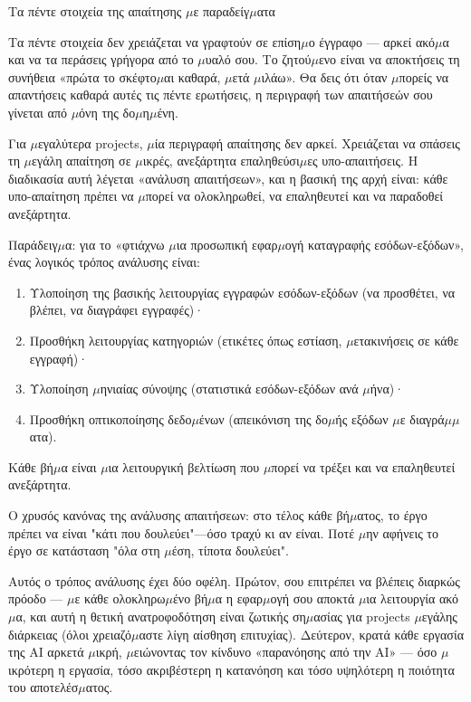 \begin{center}\small\color{gray}Τα πέντε στοιχεία της απαίτησης $\mu$ε παραδείγ$\mu$ατα\end{center}

Τα πέντε στοιχεία δεν χρειάζεται να γραφτούν σε επίση$\mu$ο έγγραφο — αρκεί ακό$\mu$α και να τα περάσεις γρήγορα από το $\mu$υαλό σου. Το ζητού$\mu$ενο είναι να αποκτήσεις τη συνήθεια «πρώτα το σκέφτο$\mu$αι καθαρά, $\mu$ετά $\mu$ιλάω». Θα δεις ότι όταν $\mu$πορείς να απαντήσεις καθαρά αυτές τις πέντε ερωτήσεις, η περιγραφή των απαιτήσεών σου γίνεται από $\mu$όνη της δο$\mu$η$\mu$ένη.


Για $\mu$εγαλύτερα projects, $\mu$ία περιγραφή απαίτησης δεν αρκεί. Χρειάζεται να σπάσεις τη $\mu$εγάλη απαίτηση σε $\mu$ικρές, ανεξάρτητα επαληθεύσι$\mu$ες υπο-απαιτήσεις. Η διαδικασία αυτή λέγεται «ανάλυση απαιτήσεων», και η βασική της αρχή είναι: κάθε υπο-απαίτηση πρέπει να $\mu$πορεί να ολοκληρωθεί, να επαληθευτεί και να παραδοθεί ανεξάρτητα.

Παράδειγ$\mu$α: για το «φτιάχνω $\mu$ια προσωπική εφαρ$\mu$ογή καταγραφής εσόδων-εξόδων», ένας λογικός τρόπος ανάλυσης είναι:

\begin{enumerate}
  \item Υλοποίηση της βασικής λειτουργίας εγγραφών εσόδων-εξόδων (να προσθέτει, να βλέπει, να διαγράφει εγγραφές)·
  \item Προσθήκη λειτουργίας κατηγοριών (ετικέτες όπως εστίαση, $\mu$ετακινήσεις σε κάθε εγγραφή)·
  \item Υλοποίηση $\mu$ηνιαίας σύνοψης (στατιστικά εσόδων-εξόδων ανά $\mu$ήνα)·
  \item Προσθήκη οπτικοποίησης δεδο$\mu$ένων (απεικόνιση της δο$\mu$ής εξόδων $\mu$ε διαγρά$\mu$$\mu$ατα).
\end{enumerate}

Κάθε βή$\mu$α είναι $\mu$ια λειτουργική βελτίωση που $\mu$πορεί να τρέξει και να επαληθευτεί ανεξάρτητα.

Ο χρυσός κανόνας της ανάλυσης απαιτήσεων: στο τέλος κάθε βή$\mu$ατος, το έργο πρέπει να είναι "κάτι που δουλεύει"—όσο τραχύ κι αν είναι. Ποτέ $\mu$ην αφήνεις το έργο σε κατάσταση "όλα στη $\mu$έση, τίποτα δουλεύει".

Αυτός ο τρόπος ανάλυσης έχει δύο οφέλη. Πρώτον, σου επιτρέπει να βλέπεις διαρκώς πρόοδο — $\mu$ε κάθε ολοκληρω$\mu$ένο βή$\mu$α η εφαρ$\mu$ογή σου αποκτά $\mu$ια λειτουργία ακό$\mu$α, και αυτή η θετική ανατροφοδότηση είναι ζωτικής ση$\mu$ασίας για projects $\mu$εγάλης διάρκειας (όλοι χρειαζό$\mu$αστε λίγη αίσθηση επιτυχίας). Δεύτερον, κρατά κάθε εργασία της AI αρκετά $\mu$ικρή, $\mu$ειώνοντας τον κίνδυνο «παρανόησης από την AI» — όσο $\mu$ικρότερη η εργασία, τόσο ακριβέστερη η κατανόηση και τόσο υψηλότερη η ποιότητα του αποτελέσ$\mu$ατος.

